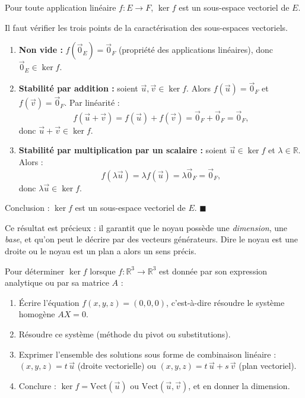 \documentclass[11pt]{article}
\newcommand{\cle}[1]{{\popxbold\color{popdark}#1}}
\begin{document}
\begin{propriete}
Pour toute application linéaire $f : E \to F$, $\ker f$ est un \cle{sous-espace vectoriel} de $E$.
\end{propriete}

\begin{experience}
Il faut vérifier les trois points de la caractérisation des sous-espaces vectoriels.
\begin{enumerate}
\item \textbf{Non vide :} $f(\vec{0}_E) = \vec{0}_F$ (propriété des applications linéaires), donc $\vec{0}_E \in \ker f$.
\item \textbf{Stabilité par addition :} soient $\vec{u}, \vec{v} \in \ker f$. Alors $f(\vec{u}) = \vec{0}_F$ et $f(\vec{v}) = \vec{0}_F$. Par linéarité :
\[
f(\vec{u} + \vec{v}) = f(\vec{u}) + f(\vec{v}) = \vec{0}_F + \vec{0}_F = \vec{0}_F,
\]
donc $\vec{u} + \vec{v} \in \ker f$.
\item \textbf{Stabilité par multiplication par un scalaire :} soient $\vec{u} \in \ker f$ et $\lambda \in \mathbb{R}$. Alors :
\[
f(\lambda \vec{u}) = \lambda f(\vec{u}) = \lambda \vec{0}_F = \vec{0}_F,
\]
donc $\lambda \vec{u} \in \ker f$.
\end{enumerate}
Conclusion : $\ker f$ est un sous-espace vectoriel de $E$. \hfill$\blacksquare$
\end{experience}

Ce résultat est précieux : il garantit que le noyau possède une \emph{dimension}, une \emph{base}, et qu'on peut le décrire par des vecteurs générateurs. Dire \og le noyau est une droite \fg{} ou \og le noyau est un plan \fg{} a alors un sens précis.

\begin{methode}
Pour déterminer $\ker f$ lorsque $f : \mathbb{R}^3 \to \mathbb{R}^3$ est donnée par son expression analytique ou par sa matrice $A$ :
\begin{enumerate}
\item Écrire l'équation $f(x, y, z) = (0, 0, 0)$, c'est-à-dire résoudre le système homogène $AX = 0$.
\item Résoudre ce système (méthode du pivot ou substitutions).
\item Exprimer l'ensemble des solutions sous forme de combinaison linéaire : $(x, y, z) = t\,\vec{u}$ (droite vectorielle) ou $(x,y,z) = t\,\vec{u} + s\,\vec{v}$ (plan vectoriel).
\item Conclure : $\ker f = \mathrm{Vect}(\vec{u})$ ou $\mathrm{Vect}(\vec{u}, \vec{v})$, et en donner la dimension.
\end{enumerate}
\end{methode}
\end{document}
